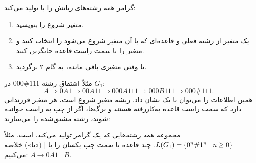 گرامر همه رشته‌های زبانش را با  تولید می‌کند:
\begin{enumerate}
\item متغیر شروع را بنویسید.
\item یک متغیر از رشته فعلی و قاعده‌ای که با آن متغیر شروع می‌شود را انتخاب کنید و متغیر را با سمت راست قاعده جایگزین کنید.
\item تا وقتی متغیری باقی مانده، به گام ۲ برگردید.
\end{enumerate}

مثلاً اشتقاق رشته $000\#111$ در $G_1$:
\[A\Rightarrow0A1\Rightarrow00A11\Rightarrow000A111\Rightarrow000B111\Rightarrow000\#111.\]
همین اطلاعات را می‌توان با یک  نشان داد. ریشه متغیر شروع است، هر متغیر فرزندانی دارد که سمت راست قاعده به‌کاررفته هستند و برگ‌ها، اگر از چپ به راست خوانده شوند، رشته مشتق‌شده را می‌سازند:
\begin{ltrfig}
\end{ltrfig}

مجموعه همه رشته‌هایی که یک گرامر تولید می‌کند،  است. مثلاً $L(G_1)=\{0^n\#1^n\mid n\ge0\}$. چند قاعده با سمت چپ یکسان را با $\mid$ («یا») خلاصه می‌کنیم: $A\to0A1\mid B$.

